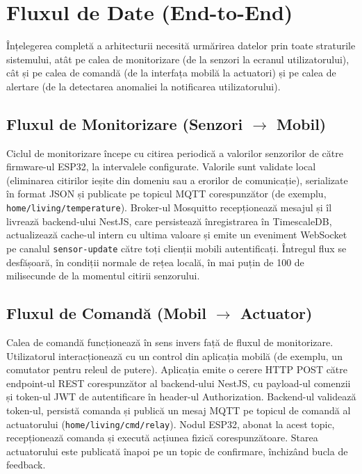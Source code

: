 \documentclass[12pt, twoside, a4paper]{report}
\begin{document}
\section{Fluxul de Date (End-to-End)}

Înțelegerea completă a arhitecturii necesită urmărirea datelor prin toate straturile
sistemului, atât pe calea de monitorizare (de la senzori la ecranul utilizatorului),
cât și pe calea de comandă (de la interfața mobilă la actuatori) și pe calea de alertare
(de la detectarea anomaliei la notificarea utilizatorului).

\subsection{Fluxul de Monitorizare (Senzori $\rightarrow$ Mobil)}

Ciclul de monitorizare începe cu citirea periodică a valorilor senzorilor de către
firmware-ul ESP32, la intervalele configurate. Valorile sunt validate local (eliminarea
citirilor ieșite din domeniu sau a erorilor de comunicație), serializate în format JSON
și publicate pe topicul MQTT corespunzător (de exemplu, \texttt{home/living/temperature}).
Broker-ul Mosquitto recepționează mesajul și îl livrează backend-ului NestJS, care
persistează înregistrarea în TimescaleDB, actualizează cache-ul intern cu ultima valoare
și emite un eveniment WebSocket pe canalul \texttt{sensor-update} către toți clienții
mobili autentificați. Întregul flux se desfășoară, în condiții normale de rețea locală,
în mai puțin de 100 de milisecunde de la momentul citirii senzorului.

\subsection{Fluxul de Comandă (Mobil $\rightarrow$ Actuator)}

Calea de comandă funcționează în sens invers față de fluxul de monitorizare.
Utilizatorul interacționează cu un control din aplicația mobilă (de exemplu, un
comutator pentru releul de putere). Aplicația emite o cerere HTTP POST către
endpoint-ul REST corespunzător al backend-ului NestJS, cu payload-ul comenzii și
token-ul JWT de autentificare în header-ul Authorization. Backend-ul validează
token-ul, persistă comanda și publică un mesaj MQTT pe topicul de comandă al
actuatorului (\texttt{home/living/cmd/relay}). Nodul ESP32, abonat la acest topic,
recepționează comanda și execută acțiunea fizică corespunzătoare. Starea actuatorului
este publicată înapoi pe un topic de confirmare, închizând bucla de feedback.
\end{document}
